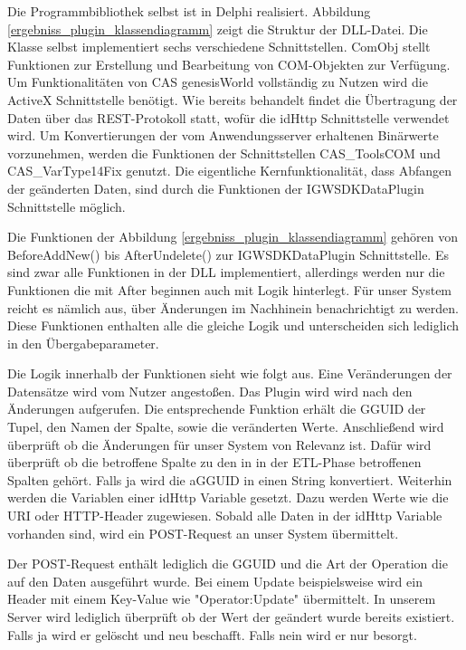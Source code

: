 Die Programmbibliothek selbst ist in Delphi realisiert. Abbildung \ref{ergebniss_plugin_klassendiagramm} zeigt die Struktur der DLL-Datei. Die Klasse selbst implementiert sechs verschiedene Schnittstellen. ComObj stellt Funktionen zur Erstellung und Bearbeitung von COM-Objekten zur Verfügung. Um Funktionalitäten von CAS genesisWorld vollständig zu Nutzen wird die ActiveX Schnittstelle benötigt. Wie bereits behandelt findet die Übertragung der Daten über das REST-Protokoll statt, wofür die idHttp Schnittstelle verwendet wird. Um Konvertierungen der vom Anwendungsserver erhaltenen Binärwerte vorzunehmen, werden die Funktionen der Schnittstellen CAS\_ToolsCOM und CAS\_VarType14Fix genutzt. Die eigentliche Kernfunktionalität, dass Abfangen der geänderten Daten, sind durch die Funktionen der IGWSDKDataPlugin Schnittstelle möglich.

Die Funktionen der Abbildung \ref{ergebniss_plugin_klassendiagramm} gehören von BeforeAddNew() bis AfterUndelete() zur IGWSDKDataPlugin Schnittstelle. Es sind zwar alle Funktionen in der DLL implementiert, allerdings werden nur die Funktionen die mit After beginnen auch mit Logik hinterlegt. Für unser System reicht es nämlich aus, über Änderungen im Nachhinein benachrichtigt zu werden. Diese Funktionen enthalten alle die gleiche Logik und unterscheiden sich lediglich in den Übergabeparameter.

Die Logik innerhalb der Funktionen sieht wie folgt aus. Eine Veränderungen der Datensätze wird vom Nutzer angestoßen. Das Plugin wird wird nach den Änderungen aufgerufen. Die entsprechende Funktion erhält die GGUID der Tupel, den Namen der Spalte, sowie die veränderten Werte. Anschließend wird überprüft ob die Änderungen für unser System von Relevanz ist. Dafür wird überprüft ob die betroffene Spalte zu den in in der ETL-Phase betroffenen Spalten gehört. Falls ja wird die aGGUID in einen String konvertiert. Weiterhin werden die Variablen einer idHttp Variable gesetzt. Dazu werden Werte wie die URI oder HTTP-Header zugewiesen. Sobald alle Daten in der idHttp Variable vorhanden sind, wird ein POST-Request an unser System übermittelt. 

Der POST-Request enthält lediglich die GGUID und die Art der Operation die auf den Daten ausgeführt wurde. Bei einem Update beispielsweise wird ein Header mit einem Key-Value wie "Operator:Update" übermittelt. In unserem Server wird lediglich überprüft ob der Wert der geändert wurde bereits existiert. Falls ja wird er gelöscht und neu beschafft. Falls nein wird er nur besorgt.


